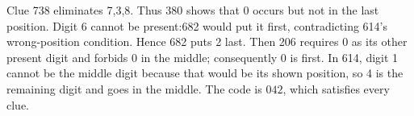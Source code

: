 Clue 738 eliminates 7,3,8. Thus 380 shows that 0 occurs but not in the last position. Digit 6 cannot be present:682 would put it first, contradicting 614's wrong-position condition. Hence 682 puts 2 last. Then 206 requires 0 as its other present digit and forbids 0 in the middle; consequently 0 is first. In 614, digit 1 cannot be the middle digit because that would be its shown position, so 4 is the remaining digit and goes in the middle. The code is $\boxed{042}$, which satisfies every clue.
